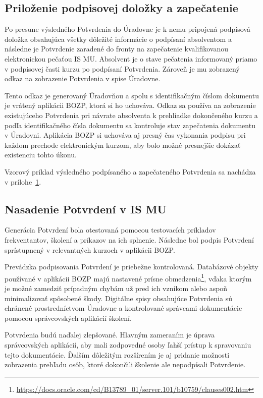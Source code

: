 \documentclass[
  digital,     %
  oneside,     %
  nosansbold,  %
  nocolorbold, %
  lof,         %
  nolot,         %
]{fithesis4}
\begin{document}
\subsection*{Priloženie podpisovej doložky a zapečatenie}
Po presune výsledného Potvrdenia do Úradovne je k nemu pripojená podpisová doložka obsahujúca všetky dôležité informácie o podpísaní absolventom a následne je Potvrdenie zaradené do fronty na zapečatenie kvalifikovanou elektronickou pečaťou IS MU. Absolvent je o stave pečatenia informovaný priamo v podpisovej časti kurzu po podpísaní Potvrdenia. Zároveň je mu zobrazený odkaz na zobrazenie Potvrdenia v spise Úradovne.

Tento odkaz je generovaný Úradovňou a spolu s identifikačným číslom dokumentu je vrátený aplikácii BOZP, ktorá si ho uchováva. Odkaz sa používa na zobrazenie existujúceho Potvrdenia pri návrate absolventa k prehliadke dokončeného kurzu a podľa identifikačného čísla dokumentu sa kontroluje stav zapečatenia dokumentu v Úradovni. Aplikácia BOZP si uchováva aj presný čas vykonania podpisu pri každom prechode elektronickým kurzom, aby bolo možné presnejšie dokázať existenciu tohto úkonu.

Vzorový príklad výsledného podpísaného a zapečateného Potvrdenia sa nachádza v prílohe~\hyperref[priloha1]{1}.

\subsection*{Nasadenie Potvrdení v IS MU}
Generácia Potvrdení bola otestovaná pomocou testovacích príkladov frekventantov, školení a príkazov na ich splnenie. Následne bol podpis Potvrdení sprístupnený v relevantných kurzoch v aplikácii BOZP.

Prevádzka podpisovania Potvrdení je priebežne kontrolovaná. Databázové objekty používané v aplikácii BOZP majú nastavené prísne obmedzenia\footnote{\url{https://docs.oracle.com/cd/B13789_01/server.101/b10759/clauses002.htm}}, vďaka ktorým je možné zamedziť prípadným chybám už pred ich vznikom alebo aspoň minimalizovať spôsobené škody. Digitálne spisy obsahujúce Potvrdenia sú chránené prostredníctvom Úradovne a kontrolované správcami dokumentácie pomocou správcovských aplikácií školení.

Potvrdenia budú naďalej zlepšované. Hlavným zameraním je úprava správcovských aplikácií, aby mali zodpovedné osoby ľahší prístup k spravovaniu tejto dokumentácie. Ďalším dôležitým rozšírením je aj pridanie možnosti zobrazenia prehľadu osôb, ktoré dokončili školenie ale nepodpísali Potvrdenie.
\end{document}
